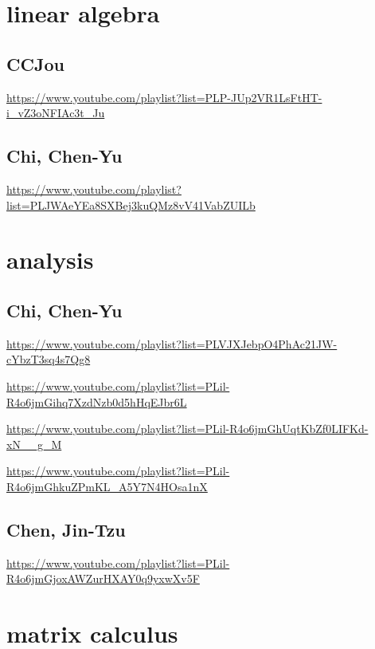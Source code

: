 \documentclass[
]{book}
\theoremstyle{definition}
\theoremstyle{definition}
\theoremstyle{definition}
\theoremstyle{definition}
\theoremstyle{remark}
\begin{document}
\chapter{linear algebra}\label{linear-algebra}

\section{CCJou}\label{ccjou}

\url{https://www.youtube.com/playlist?list=PLP-JUp2VR1LsFtHT-i_vZ3oNFIAc3t_Ju}

\section{Chi, Chen-Yu}\label{chi-chen-yu}

\url{https://www.youtube.com/playlist?list=PLJWAeYEa8SXBej3kuQMz8vV41VabZUILb}

\chapter{analysis}\label{analysis}

\section{Chi, Chen-Yu}\label{chi-chen-yu-1}

\url{https://www.youtube.com/playlist?list=PLVJXJebpO4PhAc21JW-cYbzT3sq4s7Qg8}

\url{https://www.youtube.com/playlist?list=PLil-R4o6jmGihq7XzdNzb0d5hHqEJbr6L}

\url{https://www.youtube.com/playlist?list=PLil-R4o6jmGhUqtKbZf0LIFKd-xN__g_M}

\url{https://www.youtube.com/playlist?list=PLil-R4o6jmGhkuZPmKL_A5Y7N4HOsa1nX}

\section{Chen, Jin-Tzu}\label{chen-jin-tzu}

\url{https://www.youtube.com/playlist?list=PLil-R4o6jmGjoxAWZurHXAY0q9yxwXv5F}

\chapter{matrix calculus}\label{matrix-calculus}

\textsuperscript{}
\end{document}
